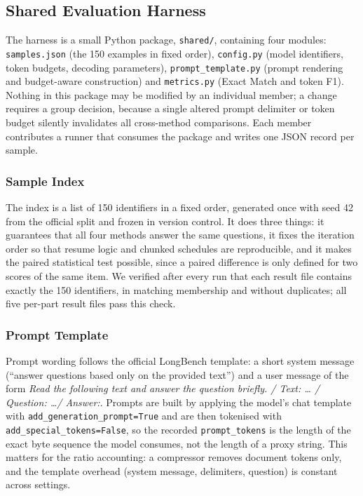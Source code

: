 \documentclass[10pt,a4paper,twocolumn]{article}
\begin{document}
\subsection{Shared Evaluation Harness}

The harness is a small Python package, \texttt{shared/}, containing four modules:
\texttt{samples.json} (the 150 examples in fixed order), \texttt{config.py} (model
identifiers, token budgets, decoding parameters), \texttt{prompt\_template.py}
(prompt rendering and budget-aware construction) and \texttt{metrics.py} (Exact
Match and token F1). Nothing in this package may be modified by an individual
member; a change requires a group decision, because a single altered prompt
delimiter or token budget silently invalidates all cross-method comparisons. Each
member contributes a runner that consumes the package and writes one JSON record
per sample.

\subsubsection{Sample Index}

The index is a list of 150 identifiers in a fixed order, generated once with seed
42 from the official split and frozen in version control. It does three things: it
guarantees that all four methods answer the same questions, it fixes the iteration
order so that resume logic and chunked schedules are reproducible, and it makes
the paired statistical test possible, since a paired difference is only defined
for two scores of the same item. We verified after every run that each result file
contains exactly the 150 identifiers, in matching membership and without
duplicates; all five per-part result files pass this check.

\subsubsection{Prompt Template}

Prompt wording follows the official LongBench template: a short system message
(``answer questions based only on the provided text'') and a user message of the
form \emph{Read the following text and answer the question briefly. / Text: \dots
/ Question: \dots / Answer:}. Prompts are built by applying the model's chat
template with \texttt{add\_generation\_prompt=True} and are then tokenised with
\texttt{add\_special\_tokens=False}, so the recorded \texttt{prompt\_tokens} is
the length of the exact byte sequence the model consumes, not the length of a
proxy string. This matters for the ratio accounting: a compressor removes document
tokens only, and the template overhead (system message, delimiters, question) is
constant across settings.
\end{document}

